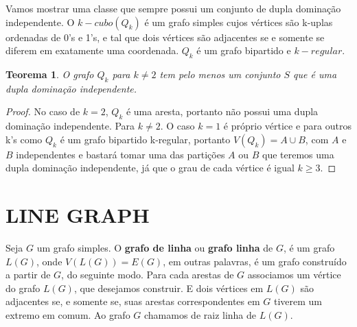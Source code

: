 \documentclass[a4paper,8pt]{article}
\theoremstyle{plain}
\newtheorem{theorem}{Teorema}[section]
\begin{document}
Vamos mostrar uma classe que sempre possui um conjunto de dupla dominação independente.
O $k-cubo(Q_k)$ é um grafo simples cujos vértices são k-uplas ordenadas de 0's e 1's, e tal que dois vértices são adjacentes se e somente se diferem em exatamente uma coordenada. $Q_k$ é um grafo bipartido e $k-regular$.
\begin{theorem}
O grafo $Q_k$ para $k\neq2$ tem pelo menos  um conjunto $S$ que é uma dupla dominação independente. 
\end{theorem}

\begin{proof}
No caso de $k=2$, $Q_k$ é uma aresta, portanto não possui uma dupla dominação independente. Para $k\neq2$. O caso $k=1$ é próprio vértice e para outros k's como $Q_k$ é um grafo bipartido k-regular, portanto $V(Q_k)=A\cup B$, com $A$ e $B$ independentes e bastará tomar  uma das partições $A$ ou $B$ que teremos uma dupla dominação independente, já que o grau de cada vértice é igual $k\geq3$.
\end{proof}


\section{ LINE GRAPH}

Seja $G$ um grafo simples. O \textbf{grafo de linha} ou \textbf{grafo linha} de $G$, é um grafo $L(G)$, onde $V(L(G))=E(G)$, em outras palavras, é um grafo construído a partir de $G$, do seguinte modo. Para cada arestas de $G$ associamos um vértice do grafo $L(G)$, que desejamos construir. E dois vértices em $L(G)$ são adjacentes se, e somente se, suas arestas correspondentes em $G$ tiverem um extremo em comum. Ao grafo $G$ chamamos de raiz linha de $L(G)$.
\end{document}
